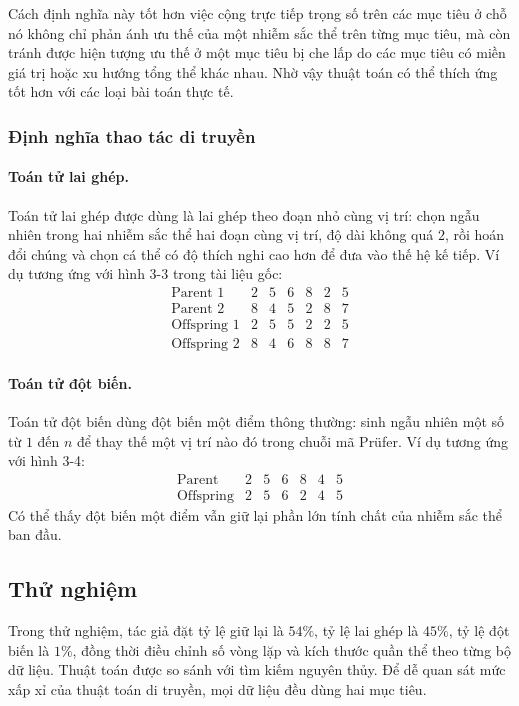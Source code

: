 \documentclass[11pt]{article}
\newcommand{\Pruefer}{Prüfer}
\begin{document}
Cách định nghĩa này tốt hơn việc cộng trực tiếp trọng số trên các mục tiêu ở
chỗ nó không chỉ phản ánh ưu thế của một nhiễm sắc thể trên từng mục tiêu, mà
còn tránh được hiện tượng ưu thế ở một mục tiêu bị che lấp do các mục tiêu có
miền giá trị hoặc xu hướng tổng thể khác nhau. Nhờ vậy thuật toán có thể thích
ứng tốt hơn với các loại bài toán thực tế.

\subsubsection{Định nghĩa thao tác di truyền}

\paragraph{Toán tử lai ghép.}
Toán tử lai ghép được dùng là lai ghép theo đoạn nhỏ cùng vị trí: chọn ngẫu
nhiên trong hai nhiễm sắc thể hai đoạn cùng vị trí, độ dài không quá \(2\), rồi
hoán đổi chúng và chọn cá thể có độ thích nghi cao hơn để đưa vào thế hệ kế
tiếp. Ví dụ tương ứng với hình 3-3 trong tài liệu gốc:
\[
\begin{array}{r|rrrrrr}
\text{Parent 1} & 2&5&6&8&2&5\\
\text{Parent 2} & 8&4&5&2&8&7\\ \hline
\text{Offspring 1} & 2&5&5&2&2&5\\
\text{Offspring 2} & 8&4&6&8&8&7
\end{array}
\]

\paragraph{Toán tử đột biến.}
Toán tử đột biến dùng đột biến một điểm thông thường: sinh ngẫu nhiên một số
từ \(1\) đến \(n\) để thay thế một vị trí nào đó trong chuỗi mã \Pruefer. Ví
dụ tương ứng với hình 3-4:
\[
\begin{array}{r|rrrrrr}
\text{Parent} & 2&5&6&8&4&5\\ \hline
\text{Offspring} & 2&5&6&2&4&5
\end{array}
\]
Có thể thấy đột biến một điểm vẫn giữ lại phần lớn tính chất của nhiễm sắc thể
ban đầu.

\subsection{Thử nghiệm}

Trong thử nghiệm, tác giả đặt tỷ lệ giữ lại là \(54\%\), tỷ lệ lai ghép là
\(45\%\), tỷ lệ đột biến là \(1\%\), đồng thời điều chỉnh số vòng lặp và kích
thước quần thể theo từng bộ dữ liệu. Thuật toán được so sánh với tìm kiếm
nguyên thủy. Để dễ quan sát mức xấp xỉ của thuật toán di truyền, mọi dữ liệu
đều dùng hai mục tiêu.
\end{document}
